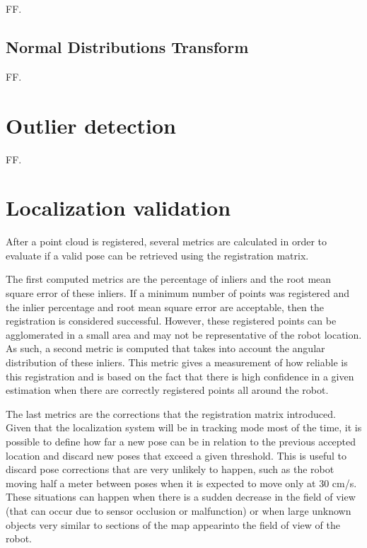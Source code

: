 FF.


\subsection{Normal Distributions Transform}

FF.



\section{Outlier detection}

FF.




\section{Localization validation}

After a point cloud is registered, several metrics are calculated in order to evaluate if a valid pose can be retrieved using the registration matrix.

The first computed metrics are the percentage of inliers and the root mean square error of these inliers. If a minimum number of points was registered and the inlier percentage and root mean square error are acceptable, then the registration is considered successful. However, these registered points can be agglomerated in a small area and may not be representative of the robot location. As such, a second metric is computed that takes into account the angular distribution of these inliers. This metric gives a measurement of how reliable is this registration and is based on the fact that there is high confidence in a given estimation when there are correctly registered points all around the robot.

The last metrics are the corrections that the registration matrix introduced. Given that the localization system will be in tracking mode most of the time, it is possible to define how far a new pose can be in relation to the previous accepted location and discard new poses that exceed a given threshold. This is useful to discard pose corrections that are very unlikely to happen, such as the robot moving half a meter between poses when it is expected to move only at 30 cm/s. These situations can happen when there is a sudden decrease in the field of view (that can occur due to sensor occlusion or malfunction) or when  large unknown objects very similar to sections of the map appearinto the field of view of the robot.

